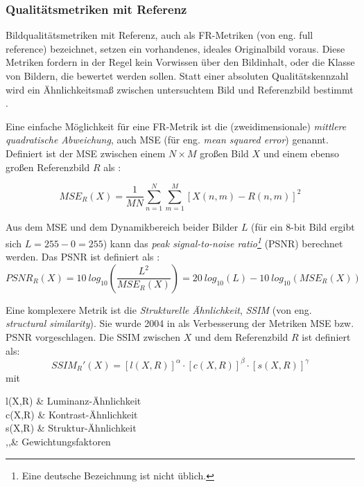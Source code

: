\subsubsection{Qualitätsmetriken mit Referenz}
Bildqualitätsmetriken mit Referenz, auch als FR-Metriken (von eng. full reference) bezeichnet, setzen ein vorhandenes, ideales Originalbild voraus. Diese Metriken fordern in der Regel kein Vorwissen über den Bildinhalt, oder die Klasse von Bildern, die bewertet werden sollen. Statt einer absoluten Qualitätskennzahl wird ein Ähnlichkeitsmaß zwischen untersuchtem Bild und Referenzbild bestimmt \cite[S.~43]{Wang2006}.

Eine einfache Möglichkeit für eine FR-Metrik ist die (zweidimensionale) \textit{mittlere quadratische Abweichung}, auch MSE (für eng. \textit{mean squared error}) genannt. Definiert ist der MSE zwischen einem $N \times M$ großen Bild $X$ und einem ebenso großen Referenzbild $R$ als \cite{Tan2013}:

\begin{equation}
	MSE_R(X)=\frac{1}{M N} \sum_{n=1}^{N} \sum_{m=1}^{M} [X(n,m) - R(n,m)]^2
\end{equation}

Aus dem MSE und dem Dynamikbereich beider Bilder $L$ (für ein 8-bit Bild ergibt sich $L=255-0=255$) kann das \textit{peak signal-to-noise ratio\footnote{Eine deutsche Bezeichnung ist nicht üblich.}} (PSNR) berechnet werden. Das PSNR ist definiert als \cite{Bondzulic2016}:
\begin{equation}
	PSNR_R(X)= 10\: log_{10}\left(\frac{L^2}{MSE_R(X)}\right) = 20\: log_{10}(L) - 10\: log_{10}(MSE_R(X))
\end{equation}

Eine komplexere Metrik ist die \textit{Strukturelle Ähnlichkeit}, \textit{SSIM} (von eng. \textit{structural similarity}). Sie wurde 2004 in \cite{Wang2004} als Verbesserung der Metriken MSE bzw. PSNR vorgeschlagen. Die SSIM zwischen $X$ und dem Referenzbild $R$ ist definiert als:
\begin{equation}
	SSIM_R'(X)=[l(X,R)]^\alpha\cdot[c(X,R)]^\beta\cdot[s(X,R)]^\gamma
\end{equation}
mit
\begin{with}
	l(X,R) & Luminanz-Ähnlichkeit\\
	c(X,R) & Kontrast-Ähnlichkeit\\
	s(X,R) & Struktur-Ähnlichkeit\\
	\alpha,\beta,\gamma & Gewichtungsfaktoren \\
\end{with}

